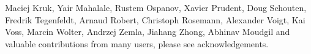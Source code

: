 \begin{center}
{Maciej Kruk,%
Yair Mahalale,%
Rustem Ospanov,%
Xavier Prudent,%
Doug Schouten,%
Fredrik Tegenfeldt,%
Arnaud Robert,%
Christoph Rosemann,%
Alexander Voigt,%
Kai Voss,%
Marcin Wolter,%
Andrzej Zemla,%
Jiahang Zhong,%
Abhinav Moudgil %
and valuable contributions from many users, please see acknowledgements.
}
\end{center}

\thispagestyle{empty}
\newpage

